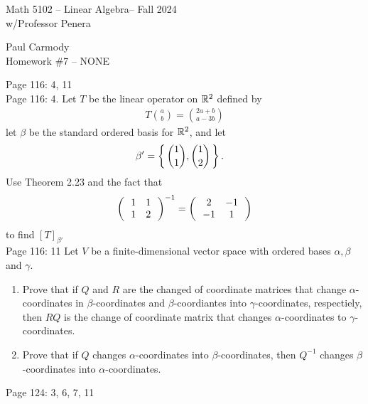 \documentclass[10pt,a4paper]{report}
\newcommand{\CLASSNAME}{Math 5102 -- Linear Algebra}
\newcommand{\STUDENTNAME}{Paul Carmody}
\newcommand{\ASSIGNMENT}{Homework \#7 }
\newcommand{\DUEDATE}{NONE}
\newcommand{\SEMESTER}{Fall 2024}
\begin{document}
\begin{center}
	\Large{\CLASSNAME -- \SEMESTER} \\
	\large{ w/Professor Penera}
\end{center}
\begin{center}
	\STUDENTNAME \\
	\ASSIGNMENT -- \DUEDATE\\
\end{center} 

\noindent Page 116: 4, 11 \\

\noindent Page 116: 4. Let $T$ be the linear operator on $\mathbb{R}^2$ defined by 
\begin{align*}
	T\binom{a}{b}=\binom{2a+b}{a-3b}
\end{align*}let $\beta$ be the standard ordered basis for $\mathbb{R}^2$, and let
\begin{align*}
	\beta' &= \left \{\, \binom{1}{1}, \binom{1}{2} \,\right \}.
\end{align*}Use Theorem 2.23 and the fact that 
\begin{align*}
	\left (\,  \begin{array}{c c} 1&1 \\ 1 & 2 \end{array}  \,\right )^{-1}=\left (\,  \begin{array}{c c} 2&-1 \\ -1 & 1 \end{array}  \,\right )
\end{align*}to find $[T]_{\beta'}$\\


\noindent Page 116: 11 Let $V$ be a finite-dimensional vector space with ordered bases $\alpha, \beta$ and $\gamma$.
	\begin{enumerate}[label=(\alph*)]
		\item Prove that if $Q$ and $R$ are the changed of coordinate matrices that change $\alpha$-coordinates in $\beta$-coordinates and $\beta$-coordiantes into $\gamma$-coordinates, respectiely, then $RQ$ is the change of coordinate matrix that changes $\alpha$-coordinates to $\gamma$-coordinates.
		\item Prove that if $Q$ changes $\alpha$-coordinates into $\beta$-coordinates, then $Q^{-1}$ changes $\beta$-coordinates into $\alpha$-coordinates.
	\end{enumerate} 

\noindent Page 124: 3, 6, 7, 11 \\
\end{document}
